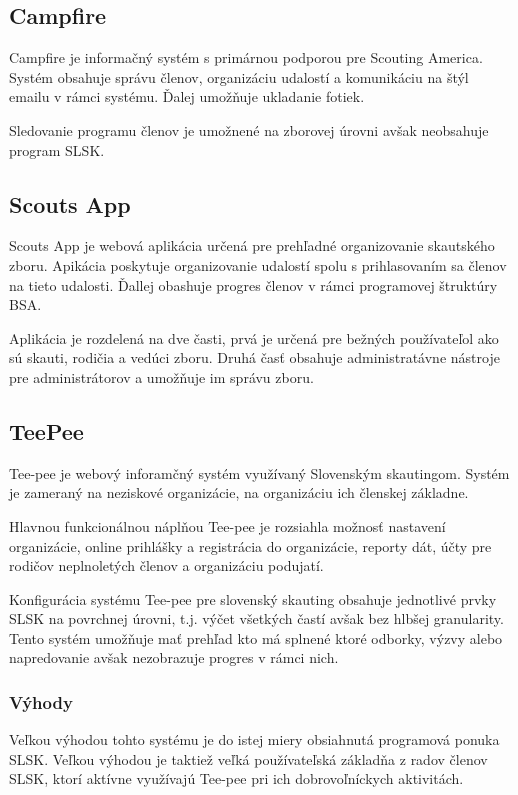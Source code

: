 \subsection{Campfire}
Campfire je informačný systém s primárnou podporou pre Scouting America. Systém obsahuje správu členov, organizáciu udalostí a komunikáciu na štýl emailu v rámci systému. Ďalej umožňuje ukladanie fotiek. 

Sledovanie programu členov je umožnené na zborovej úrovni avšak neobsahuje program SLSK. 
\cite{campfire}

\subsection{Scouts App}
Scouts App je webová aplikácia určená pre prehľadné organizovanie skautského zboru. Apikácia poskytuje organizovanie udalostí spolu s prihlasovaním sa členov na tieto udalosti. Ďallej obashuje progres členov v rámci programovej štruktúry BSA.

Aplikácia je rozdelená na dve časti, prvá je určená pre bežných používateľol ako sú skauti, rodičia a vedúci zboru. Druhá časť obsahuje administratávne nástroje pre administrátorov a umožňuje im správu zboru.
\cite{scouts_app}

\subsection{TeePee}
Tee-pee je webový inforamčný systém využívaný Slovenským skautingom. Systém je zameraný na neziskové organizácie, na organizáciu ich členskej základne.\cite{tee-pee}

Hlavnou funkcionálnou náplňou Tee-pee je rozsiahla možnosť nastavení organizácie, online prihlášky a registrácia do organizácie, reporty dát, účty pre rodičov neplnoletých členov a organizáciu podujatí.\cite{tee-pee-funkcionality}

Konfigurácia systému Tee-pee pre slovenský skauting obsahuje jednotlivé prvky SLSK na povrchnej úrovni, t.j. výčet všetkých častí avšak bez hlbšej granularity. Tento systém umožňuje mať prehľad kto má splnené ktoré odborky, výzvy alebo napredovanie avšak nezobrazuje progres v rámci nich.

\subsubsection{Výhody}
Veľkou výhodou tohto systému je do istej miery obsiahnutá programová ponuka SLSK. Veľkou výhodou je taktiež veľká používateľská základňa z radov členov SLSK, ktorí aktívne využívajú Tee-pee pri ich dobrovoľníckych aktivitách. 

